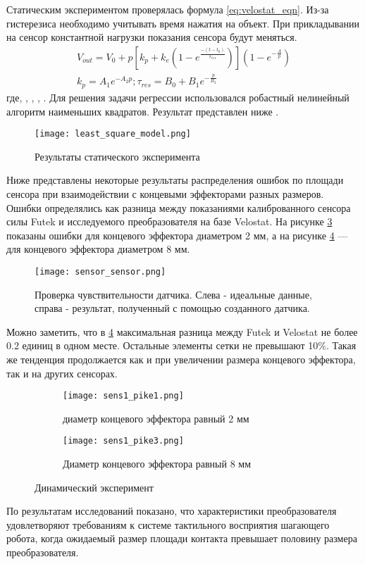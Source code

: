 Статическим экспериментом проверялась формула \eqref{eq:velostat_eqn}. Из-за гистерезиса необходимо учитывать время нажатия на объект. При прикладывании на сенсор константной нагрузки показания сенсора будут меняться.
\begin{eqnarray}
    \label{eq:velostat_eqn}
    V_{out} = V_0 + p[k_p + k_e(1-e^\frac{-(t-t_0)}{\tau_{res}})](1-e^{-\frac{A}{p}}) \\
    k_p = A_1e^{-A_2p}; \tau_{res} = B_0 + B_1e^{-\frac{p}{B_2}}
\end{eqnarray}
где,  , , , .
Для решения задачи регрессии использовался робастный нелинейный алгоритм наименьших квадратов. Результат представлен ниже .

\begin{figure}[H]
    \centering\texttt{[image: least\_square\_model.png]}
    \caption{Результаты статического эксперимента}
    \label{fig:least_square_model.png}
\end{figure}

Ниже  представлены некоторые результаты распределения ошибок по площади сенсора при взаимодействии с концевыми эффекторами разных размеров. Ошибки определялись как разница между показаниями калиброванного сенсора силы Futek и исследуемого преобразователя на базе Velostat. На рисунке \ref{fig:sens1_pike1} показаны ошибки для концевого эффектора диаметром 2 мм, а на рисунке \ref{fig:sens1_pike3} — для концевого эффектора диаметром 8 мм.

\begin{figure}[H]
    \centering\texttt{[image: sensor\_sensor.png]}\\
    \caption{Проверка чувствительности датчика. Слева - идеальные данные, справа - результат, полученный с помощью созданного датчика.}
    \label{fig:sensor_sensor}
    \end{figure}

Можно заметить, что в \ref{fig:sens1_pike3} максимальная разница между Futek и Velostat не более 0.2 единиц в одном месте. Остальные элементы сетки не превышают 10\%. Такая же тенденция продолжается как и при увеличении размера концевого эффектора, так и на других сенсорах.


\begin{figure}[H]
    \begin{subfigure}{0.49\textwidth}
        \centering\texttt{[image: sens1\_pike1.png]}
        \caption{диаметр концевого эффектора равный 2 мм }
        \label{fig:sens1_pike1}
    \end{subfigure}
    \begin{subfigure}{0.49\textwidth}
        \centering\texttt{[image: sens1\_pike3.png]}
        \caption{Диаметр концевого эффектора равный 8 мм }
        \label{fig:sens1_pike3}
    \end{subfigure}
    \caption{Динамический эксперимент}
    \label{fig:dynamics_exp}
\end{figure}

По результатам исследований показано, что характеристики преобразователя удовлетворяют требованиям к системе тактильного восприятия шагающего робота, когда ожидаемый размер площади контакта превышает половину размера преобразователя.